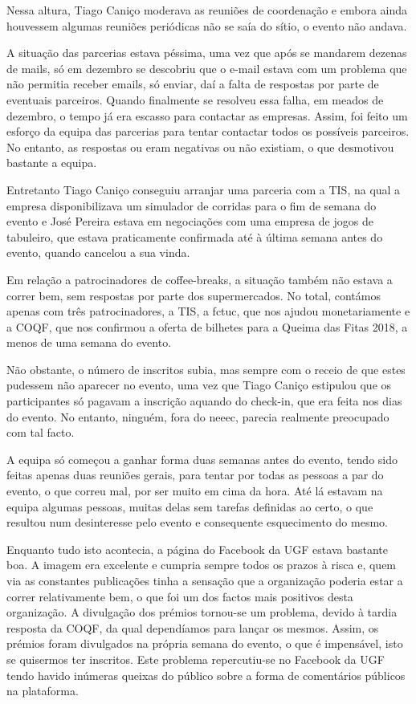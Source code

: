 Nessa altura, Tiago Caniço moderava as reuniões de coordenação e embora ainda houvessem algumas reuniões periódicas não se saía do sítio, o evento não andava.

A situação das parcerias estava péssima, uma vez que após se mandarem dezenas de mails, só em dezembro se descobriu que o e-mail estava com um problema que não permitia receber emails, só enviar, daí a falta de respostas por parte de eventuais parceiros. Quando finalmente se resolveu essa falha, em meados de dezembro, o tempo já era escasso para contactar as empresas. Assim, foi feito um esforço da equipa das parcerias para tentar contactar todos os possíveis parceiros. No entanto, as respostas ou eram negativas ou não existiam, o que desmotivou bastante a equipa.

Entretanto Tiago Caniço conseguiu arranjar uma parceria com a TIS, na qual a empresa disponibilizava um simulador de corridas para o fim de semana do evento e José Pereira estava em negociações com uma empresa de jogos de tabuleiro, que estava praticamente confirmada até à última semana antes do evento, quando cancelou a sua vinda.

Em relação a patrocinadores de coffee-breaks, a situação também não estava a correr bem, sem respostas por parte dos supermercados. No total, contámos apenas com três patrocinadores, a TIS, a \acrshort{fctuc}, que nos ajudou monetariamente e a COQF, que nos confirmou a oferta de bilhetes para a Queima das Fitas 2018, a menos de uma semana do evento.

Não obstante, o número de inscritos subia, mas sempre com o receio de que estes pudessem não aparecer no evento, uma vez que Tiago Caniço estipulou que os participantes só pagavam a inscrição aquando do check-in, que era feita nos dias do evento. No entanto, ninguém, fora do \acrshort{neeec}, parecia realmente preocupado com tal facto.

A equipa só começou a ganhar forma duas semanas antes do evento, tendo sido feitas apenas duas reuniões gerais, para tentar por todas as pessoas a par do evento, o que correu mal, por ser muito em cima da hora. Até lá estavam na equipa algumas pessoas, muitas delas sem tarefas definidas ao certo, o que resultou num desinteresse pelo evento e consequente esquecimento do mesmo.

Enquanto tudo isto acontecia, a página do Facebook da UGF estava bastante boa. A imagem era excelente e cumpria sempre todos os prazos à risca e, quem via as constantes publicações tinha a sensação que a organização poderia estar a correr relativamente bem, o que foi um dos factos mais positivos desta organização.
A divulgação dos prémios tornou-se um problema, devido à tardia resposta da COQF, da qual dependíamos para lançar os mesmos. Assim, os prémios foram divulgados na própria semana do evento, o que é impensável, isto se quisermos ter inscritos. Este problema repercutiu-se no Facebook da UGF tendo havido inúmeras queixas do público sobre a forma de comentários públicos na plataforma.

